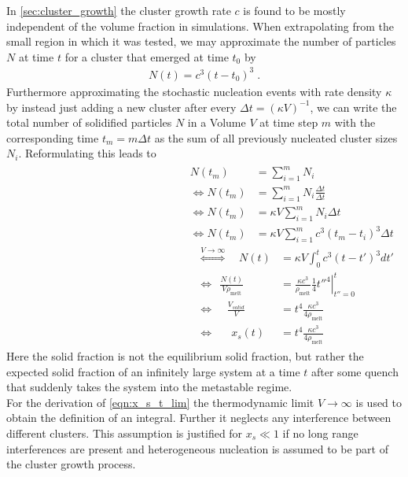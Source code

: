 In \autoref{sec:cluster_growth} the cluster growth rate $c$ is found to be mostly independent of the volume fraction in simulations. When extrapolating from the small region in which it was tested, we may approximate the number of particles $N$ at time $t$ for a cluster that emerged at time $t_0$ by
\begin{align}
N(t) = c^3 (t-t_0)^3 \; \text{.}
\end{align} 
Furthermore approximating the stochastic nucleation events with rate density $\kappa$ by instead just adding a new cluster after every $\Delta t = (\kappa V)^{-1}$, we can write the total number of solidified particles $N$ in a Volume $V$ at time step $m$ with the corresponding time $t_m = m \Delta t$ as the sum of all previously nucleated cluster sizes $N_i$. Reformulating this leads to
\begin{align}
\begin{split}
N(t_m)&=\sum_{i=1}^m N_i\\
\Leftrightarrow N(t_m)&=\sum_{i=1}^m N_i \frac{\Delta t}{\Delta t}\\
\Leftrightarrow N(t_m)&=\kappa V \sum_{i=1}^m N_i \Delta t\\
\Leftrightarrow N(t_m)&=\kappa V \sum_{i=1}^m c^3 (t_m-t_i)^3 \Delta t
\end{split}
\begin{split}
\label{eqn:x_s_t_lim}
\stackrel{V \rightarrow \infty } {\Leftrightarrow} \quad N(t)&=\kappa V \int_0^{t} c^3 (t - t')^3 d t'\\
\Leftrightarrow \; \, \frac{N(t)}{V \rho_{\text{melt}}}&=\frac{\kappa c^3}{\rho_{\text{melt}}} \left. \frac{1}{4}t''^4 \right|_{t''=0}^t\\
\Leftrightarrow \; \; \; \; \frac{V_{solid}}{V} &= t^4 \frac{\kappa c^3}{4 \rho_{\text{melt}}}\\
\Leftrightarrow \quad \; \: x_s(t)&= t^4 \frac{\kappa c^3}{4 \rho_{\text{melt}}}
\end{split}
\end{align}
Here the solid fraction is not the equilibrium solid fraction, but rather the expected solid fraction of an infinitely large system at a time $t$ after some quench that suddenly takes the system into the metastable regime.\\ 
For the derivation of \autoref{eqn:x_s_t_lim} the thermodynamic limit $V\rightarrow \infty$ is used to obtain the definition of an integral. Further it neglects any interference between different clusters. This assumption is justified for $x_s \ll 1$ if no long range interferences are present and heterogeneous nucleation is assumed to be part of the cluster growth process.\\

